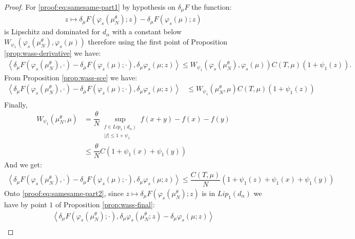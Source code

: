 \documentclass[11pt,a4paper]{article}
\newcommand{\brac}[1]{\left\langle#1\right\rangle}
\begin{document}
\begin{proof}
    For \eqref{proof:eq:samesame-part1} by hypothesis on $\delta_\mu F$ the function:
    \begin{align*}
        z \mapsto \delta_\mu F\left(\varphi_s\left(\mu^\theta_N\right);z\right) - \delta_\mu F(\varphi_s(\mu);z)
    \end{align*}
    is Lipschitz and dominated for $d_\alpha$ with a constant below $W_{\psi_1}\left(\varphi_s\left(\mu^\theta_N\right), \varphi_s\left(\mu\right) \right)$ therefore using the first point of Proposition \ref{prop:wass-derivative} we have:
    \begin{align*}
        \brac{\delta_\mu F\left(\varphi_s\left(\mu^\theta_N\right),\cdot\right) - \delta_\mu F(\varphi_s(\mu);\cdot),\delta_\mu \varphi_s (\mu;z)} \leq W_{\psi_1}\left(\varphi_s\left(\mu^\theta_N\right), \varphi_s\left(\mu\right) \right) C(T,\mu) (1 + \psi_1(z)).
    \end{align*}
    From Proposition \ref{prop:wass-sce} we have:
    \begin{align*}
        \brac{\delta_\mu F\left(\varphi_s\left(\mu^\theta_N\right),\cdot\right) - \delta_\mu F(\varphi_s(\mu);\cdot),\delta_\mu \varphi_s (\mu;z)} &\leq W_{\psi_1}\left(\mu^\theta_N,\mu\right) C(T,\mu) (1 + \psi_1(z)) \\
    \end{align*}
    Finally,
    \begin{align*}
        W_{\psi_1}\left(\mu^\theta_N,\mu\right) &= \dfrac{\theta}{N} \sup\limits_{\substack{f \in Lip_1(d_\alpha) \\ |f| \leq 1 + \psi_1}} f(x+y) - f(x) - f(y) \\
        &\leq \dfrac{\theta}{N} C(1 + \psi_1(x) + \psi_1(y))
    \end{align*}
    And we get:
    \begin{align*}
        \brac{\delta_\mu F\left(\varphi_s\left(\mu^\theta_N\right),\cdot\right) - \delta_\mu F(\varphi_s(\mu);\cdot),\delta_\mu \varphi_s (\mu;z)} \leq \dfrac{C(T,\mu)}{N}(1 + \psi_1(z) + \psi_1(x) + \psi_1(y))
    \end{align*}
    Onto \eqref{proof:eq:samesame-part2}, since $z \mapsto \delta_\mu F\left(\varphi_s\left(\mu^\theta_N\right);z\right)$ is in $Lip_1(d_\alpha)$ we have by point $1$ of Proposition \ref{prop:wass-final}:
    \begin{multline*}
        \brac{\delta_\mu F\left(\varphi_s\left(\mu^\theta_N\right);\cdot\right),\delta_\mu \varphi_s \left(\mu^\theta_N;z\right) - \delta_\mu \varphi_s (\mu;z)}\\

\end{multline*}
\end{proof}
\end{document}
